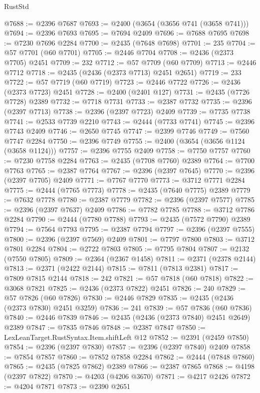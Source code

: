 \begin{lexlean}{RustStd}
\begin{coremodule}
@7688 := @2396 @7687
@7693 := @2400 (@3654 (@3656 @741 (@3658 @741)))
@7694 := @2396 @7693
@7695 := @7694 @2409
@7696 := @7688 @7695
@7698 := @7230 @7696 @2284
@7700 := @2435 (@7648 @7698)
@7701 := 235
@7704 := @57 @7701 (@60 @7701)
@7705 := @2446 @7704
@7708 := @2436 (@2373 @7705) @2451
@7709 := 232
@7712 := @57 @7709 (@60 @7709)
@7713 := @2446 @7712
@7718 := @2435 (@2436 (@2373 @7713) @2451 @2651)
@7719 := 233
@7722 := @57 @7719 (@60 @7719)
@7723 := @2446 @7722
@7726 := @2436 (@2373 @7723) @2451
@7728 := @2400 (@2401 @127)
@7731 := @2435 (@7726 @7728) @2389
@7732 := @7718 @7731
@7733 := @2387 @7732
@7735 := @2396 (@2397 @7713)
@7738 := @2396 (@2397 @7723) @2409
@7739 := @7735 @7738
@7741 := @2533 @7739 @2210
@7743 := @2444 (@7733 @7741)
@7745 := @2396 @7743 @2409
@7746 := @2650 @7745
@7747 := @2399 @7746
@7749 := @7560 @7747 @2284
@7750 := @2396 @7749
@7755 := @2400 (@3654 (@3656 @1124 (@3658 @1124)))
@7757 := @2396 @7755 @2409
@7758 := @7750 @7757
@7760 := @7230 @7758 @2284
@7763 := @2435 (@7708 @7760) @2389
@7764 := @7700 @7763
@7765 := @2387 @7764
@7767 := @2396 (@2397 @7645)
@7770 := @2396 (@2397 @7705) @2409
@7771 := @7767 @7770
@7773 := @3712 @7771 @2284
@7775 := @2444 (@7765 @7773)
@7778 := @2435 (@7640 @7775) @2389
@7779 := @7632 @7778
@7780 := @2387 @7779
@7782 := @2396 (@2397 @7577)
@7785 := @2396 (@2397 @7637) @2409
@7786 := @7782 @7785
@7788 := @3712 @7786 @2284
@7790 := @2444 (@7780 @7788)
@7793 := @2435 (@7572 @7790) @2389
@7794 := @7564 @7793
@7795 := @2387 @7794
@7797 := @2396 (@2397 @7555)
@7800 := @2396 (@2397 @7569) @2409
@7801 := @7797 @7800
@7803 := @3712 @7801 @2284
@7804 := @2722 @7803
@7805 := @7795 @7804
@7807 := @2132 (@7550 @7805)
@7809 := @2364 (@2367 @1458)
@7811 := @2371 (@2378 @2144)
@7813 := @2371 (@2422 @2144)
@7815 := @7811 (@7813 @2381)
@7817 := @7809 @7815 @2144
@7818 := 242
@7821 := @57 @7818 (@60 @7818)
@7822 := @3068 @7821
@7825 := @2436 (@2373 @7822) @2451
@7826 := 240
@7829 := @57 @7826 (@60 @7826)
@7830 := @2446 @7829
@7835 := @2435 (@2436 (@2373 @7830) @2451 @3259)
@7836 := 241
@7839 := @57 @7836 (@60 @7836)
@7840 := @2446 @7839
@7846 := @2435 (@2436 (@2373 @7840) @2451 @2649) @2389
@7847 := @7835 @7846
@7848 := @2387 @7847
@7850 := LexLeanTarget.RustSyntax.Item.shiftLeft @12
@7852 := @2391 (@2459 @7850)
@7854 := @2396 (@2397 @7830)
@7857 := @2396 (@2397 @7840) @2409
@7858 := @7854 @7857
@7860 := @7852 @7858 @2284
@7862 := @2444 (@7848 @7860)
@7865 := @2435 (@7825 @7862) @2389
@7866 := @2387 @7865
@7868 := @4198 (@2397 @7822)
@7870 := @4203 (@4206 @3670)
@7871 := @4217 @2426
@7872 := @4204 @7871
@7873 := @2390 @2651

\end{coremodule}
\end{lexlean}
